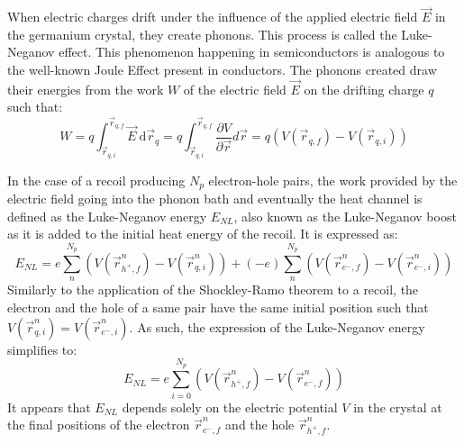When electric charges drift under the influence of the applied electric field $\vec{E}$ in the germanium crystal, they create phonons. This process is called the Luke-Neganov effect. This phenomenon happening in semiconductors is analogous to the well-known Joule Effect present in conductors. The phonons created draw their energies from the work $W$ of the electric field $\vec{E}$ on the drifting charge $q$ such that: 
\begin{equation}
W
=
q \int_{ \vec{r}_{q,i} }^{ \vec{r}_{q,f} } \vec{E} \ \mathrm{d}\vec{r}_q
=
q \int_{ \vec{r}_{q,i} }^{ \vec{r}_{q,f} } \frac{\partial V}{\partial \vec{r}} d\vec{r}
=
q \left( V(\vec{r}_{q,f}) - V(\vec{r}_{q,i}) \right)
\end{equation}

In the case of a recoil producing $N_p$ electron-hole pairs, the work provided by the electric field going into the phonon bath and eventually the heat channel is defined as the Luke-Neganov energy $E_{NL}$, also known as the Luke-Neganov boost as it is added to the initial heat energy of the recoil. It is expressed as:
\begin{equation}
E_{NL}
=
e \sum_{n}^{N_p} \left( V(\vec{r}_{h^+,f}^n) - V(\vec{r}_{q,i}^n) \right)
+ 
(- e) \sum_{n}^{N_p} \left( V(\vec{r}_{e^-,f}^n) - V(\vec{r}_{e^-,i}^n) \right)
\end{equation}
Similarly to the application of the Shockley-Ramo theorem to a recoil, the electron and the hole of a same pair have the same initial position such that $V(\vec{r}_{q,i}^n) = V(\vec{r}_{e^-,i}^n)$. As such, the expression of the Luke-Neganov energy simplifies to:
\begin{equation}
E_{NL}
=
e \sum_{i=0}^{N_p} \left( V(\vec{r}_{h^+,f}^n) - V(\vec{r}_{e^-,f}^n) \right)
\end{equation}
It appears that $E_{NL}$ depends solely on the electric potential $V$ in the crystal at the final positions of the electron $\vec{r}_{e^-,f}^n$ and the hole $\vec{r}_{h^+,f}^n$.



